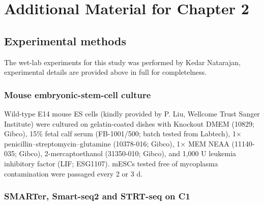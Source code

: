 \chapter{Additional Material for Chapter 2} 

\graphicspath{{Appendix1/Figs/}}

\section{Experimental methods} \label{sec:power-analysis-methods}

The wet-lab experiments for this study was performed by Kedar Natarajan, experimental details are provided above in full for completelness.

\subsection{Mouse embryonic-stem-cell culture}

\begin{sloppypar}
Wild-type E14 mouse ES cells (kindly provided by P. Liu, Wellcome Trust Sanger Institute) were cultured on gelatin-coated dishes with Knockout DMEM (10829; Gibco), 15\% fetal calf serum (FB-1001/500; batch tested from Labtech), 1× penicillin–streptomycin–glutamine (10378-016; Gibco), 1× MEM NEAA (11140-035; Gibco), 2-mercaptoethanol (31350-010; Gibco), and 1,000 U leukemia inhibitory factor (LIF; ESG1107). mESCs tested free of mycoplasma contamination were passaged every 2 or 3 d.
\end{sloppypar}

\subsection{SMARTer, Smart-seq2 and STRT-seq on C1}


